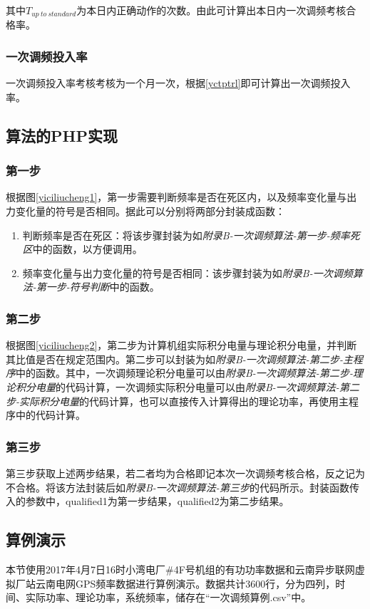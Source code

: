 \documentclass[winfonts,UTF8,a4paper]{ctexart}
\begin{document}
其中$ T_{up\ to\ standard} $为本日内正确动作的次数。由此可计算出本日内一次调频考核合格率。


\subsubsection{一次调频投入率}
一次调频投入率考核考核为一个月一次，根据\ref{yctptrl}即可计算出一次调频投入率。

\subsection{算法的PHP实现}
\subsubsection{第一步}
根据图\ref{yiciliucheng1}，第一步需要判断频率是否在死区内，以及频率变化量与出力变化量的符号是否相同。据此可以分别将两部分封装成函数：

\begin{enumerate}
	\item 判断频率是否在死区：将该步骤封装为如\textit{附录B-一次调频算法-第一步-频率死区}中的函数，以方便调用。
	
	\item 频率变化量与出力变化量的符号是否相同：该步骤封装为如\textit{附录B-一次调频算法-第一步-符号判断}中的函数。
\end{enumerate}

\subsubsection{第二步}

根据图\ref{yiciliucheng2}，第二步为计算机组实际积分电量与理论积分电量，并判断其比值是否在规定范围内。第二步可以封装为如\textit{附录B-一次调频算法-第二步-主程序}中的函数。其中，一次调频理论积分电量可以由\textit{附录B-一次调频算法-第二步-理论积分电量}的代码计算，一次调频实际积分电量可以由\textit{附录B-一次调频算法-第二步-实际积分电量}的代码计算，也可以直接传入计算得出的理论功率，再使用主程序中的代码计算。

\subsubsection{第三步}
第三步获取上述两步结果，若二者均为合格即记本次一次调频考核合格，反之记为不合格。将该方法封装后如\textit{附录B-一次调频算法-第三步}的代码所示。封装函数传入的参数中，qualified1为第一步结果，qualified2为第二步结果。

\subsection{算例演示}
本节使用2017年4月7日16时小湾电厂\#4F号机组的有功功率数据和云南异步联网虚拟厂站云南电网GPS频率数据进行算例演示。数据共计3600行，分为四列，时间、实际功率、理论功率，系统频率，储存在“一次调频算例.csv”中。
\end{document}
